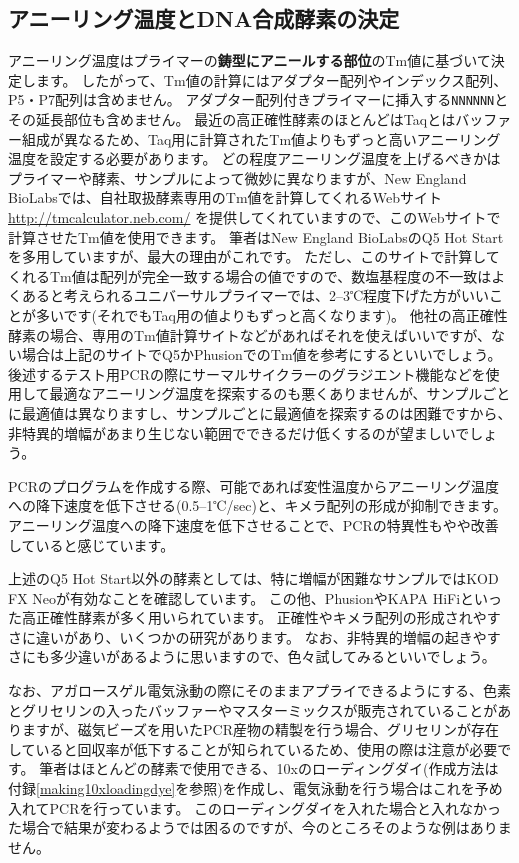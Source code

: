 \documentclass[titlepage,10pt,a4paper,uplatex]{jsbook}
\renewcommand{\textbf}[1]{{\bfseries\sffamily#1}}
\begin{document}
\subsection{アニーリング温度とDNA合成酵素の決定}

アニーリング温度はプライマーの\textbf{鋳型にアニールする部位}のTm値に基づいて決定します。
したがって、Tm値の計算にはアダプター配列やインデックス配列、P5・P7配列は含めません。
アダプター配列付きプライマーに挿入する\texttt{NNNNNN}とその延長部位も含めません。
最近の高正確性酵素のほとんどはTaqとはバッファー組成が異なるため、Taq用に計算されたTm値よりもずっと高いアニーリング温度を設定する必要があります。
どの程度アニーリング温度を上げるべきかはプライマーや酵素、サンプルによって微妙に異なりますが、New England BioLabsでは、自社取扱酵素専用のTm値を計算してくれるWebサイト \url{http://tmcalculator.neb.com/} を提供してくれていますので、このWebサイトで計算させたTm値を使用できます。
筆者はNew England BioLabsのQ5 Hot Startを多用していますが、最大の理由がこれです。
ただし、このサイトで計算してくれるTm値は配列が完全一致する場合の値ですので、数塩基程度の不一致はよくあると考えられるユニバーサルプライマーでは、2--3℃程度下げた方がいいことが多いです(それでもTaq用の値よりもずっと高くなります)。
他社の高正確性酵素の場合、専用のTm値計算サイトなどがあればそれを使えばいいですが、ない場合は上記のサイトでQ5かPhusionでのTm値を参考にするといいでしょう。
後述するテスト用PCRの際にサーマルサイクラーのグラジエント機能などを使用して最適なアニーリング温度を探索するのも悪くありませんが、サンプルごとに最適値は異なりますし、サンプルごとに最適値を探索するのは困難ですから、非特異的増幅があまり生じない範囲でできるだけ低くするのが望ましいでしょう。

PCRのプログラムを作成する際、可能であれば変性温度からアニーリング温度への降下速度を低下させる(0.5--1℃/sec)と、キメラ配列の形成が抑制できます\citep{Stevens2013}。
アニーリング温度への降下速度を低下させることで、PCRの特異性もやや改善していると感じています。

上述のQ5 Hot Start以外の酵素としては、特に増幅が困難なサンプルではKOD FX Neoが有効なことを確認しています。
この他、PhusionやKAPA HiFiといった高正確性酵素が多く用いられています。
正確性やキメラ配列の形成されやすさに違いがあり、いくつかの研究があります\citep{Potapov2017,Sze2019}。
なお、非特異的増幅の起きやすさにも多少違いがあるように思いますので、色々試してみるといいでしょう。

なお、アガロースゲル電気泳動の際にそのままアプライできるようにする、色素とグリセリンの入ったバッファーやマスターミックスが販売されていることがありますが、磁気ビーズを用いたPCR産物の精製を行う場合、グリセリンが存在していると回収率が低下することが知られているため、使用の際は注意が必要です。
筆者はほとんどの酵素で使用できる、10xのローディングダイ(作成方法は付録\ref{making10xloadingdye}を参照)を作成し、電気泳動を行う場合はこれを予め入れてPCRを行っています。
このローディングダイを入れた場合と入れなかった場合で結果が変わるようでは困るのですが、今のところそのような例はありません。
\end{document}
